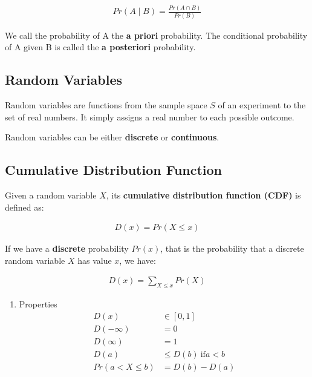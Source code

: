 \documentclass[11pt]{article}
\begin{document}
\begin{align*}
     Pr\left(A \mid B\right) = \frac{Pr\left(A \cap B\right)}{Pr\left(B\right)}
\end{align*}

We call the probability of A the \textbf{a priori} probability. The conditional probability of A given B is called the \textbf{a posteriori} probability.

\subsection{Random Variables}
\label{sec:orgede13ea}
Random variables are functions from the sample space \(S\) of an experiment to the set of real numbers. It simply assigns a real number to each possible outcome.

Random variables can be either \textbf{discrete} or \textbf{continuous}.

\subsection{Cumulative Distribution Function}
\label{sec:org10c402e}
Given a random variable \(X\), its \textbf{cumulative distribution function (CDF)} is defined as:

 \begin{align*}
     D\left( x \right) = Pr\left(X \leq x\right)
\end{align*}

If we have a \textbf{discrete} probability \(Pr\left( x \right)\), that is the probability that a discrete random variable \(X\) has value \(x\), we have:

\begin{align*}
    D\left( x \right) = \sum_{X \leq x} Pr\left( X \right)
\end{align*}

\begin{enumerate}
\item Properties
\label{sec:orgbc9ab9e}
\begin{align*}
    D\left( x \right) &\in \left[0,1\right] \\
    D\left( -\infty \right) &= 0 \\
    D\left( \infty \right) &= 1 \\
    D\left( a \right) &\leq D\left( b \right)\ \text{if} a < b \\
    Pr\left( a < X \leq b \right) &= D\left( b \right) - D\left( a \right)
\end{align*}
\end{enumerate}
\end{document}

